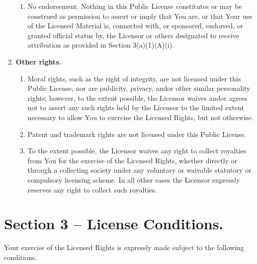 \begin{enumerate}[label=\alph*.]
\begin{enumerate}[label=\arabic*.]
      \item   No endorsement. Nothing in this Public License constitutes or may be construed as permission to assert or imply that You are, or that Your use of the Licensed Material is, connected with, or sponsored, endorsed, or granted official status by, the Licensor or others designated to receive attribution as provided in Section 3(a)(1)(A)(i).
    \end{enumerate}

  \item \textbf{Other rights.}

    \begin{enumerate}[label=\arabic*.]
      \item Moral rights, such as the right of integrity, are not licensed under this Public License, nor are publicity, privacy, and\myslash or other similar personality rights; however, to the extent possible, the Licensor waives and\myslash or agrees not to assert any such rights held by the Licensor to the limited extent necessary to allow You to exercise the Licensed Rights, but not otherwise.

      \item Patent and trademark rights are not licensed under this Public License.

      \item To the extent possible, the Licensor waives any right to collect royalties from You for the exercise of the Licensed Rights, whether directly or through a collecting society under any voluntary or waivable statutory or compulsory licensing scheme. In all other cases the Licensor expressly reserves any right to collect such royalties.

    \end{enumerate}
\end{enumerate}


\section{Section 3 – License Conditions.}
\label{section3}

Your exercise of the Licensed Rights is expressly made subject to the following conditions.

